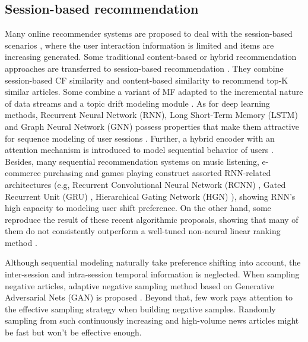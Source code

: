 \subsection{Session-based recommendation}
Many online recommender systems are proposed to deal with the session-based scenarios \cite{epure_recommending_2017, zhou_variational_2019}, where the user interaction information is limited and items are increasing generated. Some traditional content-based or hybrid recommendation approaches are transferred to session-based recommendation \cite{sottocornola2018session}.  They combine session-based CF similarity and content-based similarity to recommend top-K similar articles. Some combine a variant of MF adapted to the incremental nature of data streams and a topic drift modeling module \cite{al2018adaptive}. As for deep learning methods, Recurrent Neural Network (RNN), Long Short-Term Memory (LSTM) and Graph Neural Network (GNN) possess properties that make them attractive for sequence modeling of user sessions \cite{guo_streaming_2019, hidasi2015session, wang2019modeling, moreira_news_2018, wu2019session}. Further, a hybrid encoder with an attention mechanism is introduced to model sequential behavior of users \cite{li2017neural, liu2018stamp, xu2019time, song_islf_2019, zhang_feature-level_2019}. 
Besides, many sequential recommendation systems \cite{pereira2019online, xu2019graph} on music listening, e-commerce purchasing and games playing construct assorted RNN-related architectures (e.g, Recurrent Convolutional Neural Network (RCNN) \cite{xu_recurrent_2019}, Gated Recurrent Unit (GRU) \cite{hidasi2018recurrent}, Hierarchical Gating Network (HGN) \cite{xiao2019hierarchical, ma2019hierarchical}), showing RNN's high capacity to modeling user shift preference. On the other hand, some reproduce the result of these recent algorithmic proposals, showing that many of them do not consistently outperform a well-tuned non-neural linear ranking method \cite{dacrema_are_2019, ludewig_performance_2019}.

Although sequential modeling naturally take preference shifting into account, the inter-session and intra-session temporal information is neglected. When sampling negative articles, adaptive negative sampling method based on Generative Adversarial Nets (GAN) is proposed \cite{wang_neural_2018}. Beyond that, few work pays attention to the effective sampling strategy when building negative samples. Randomly sampling from such continuously increasing and high-volume news articles might be fast but won't be effective enough.


